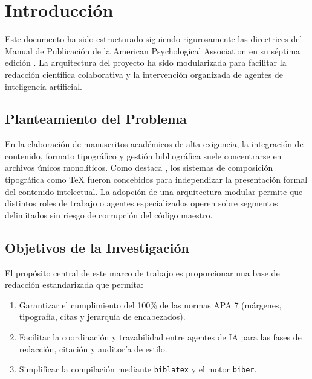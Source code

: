 \section{Introducción}\label{sec:introduccion}

Este documento ha sido estructurado siguiendo rigurosamente las directrices del Manual de Publicación de la American Psychological Association en su séptima edición \parencite{apa2020}. La arquitectura del proyecto ha sido modularizada para facilitar la redacción científica colaborativa y la intervención organizada de agentes de inteligencia artificial.

\subsection{Planteamiento del Problema}
En la elaboración de manuscritos académicos de alta exigencia, la integración de contenido, formato tipográfico y gestión bibliográfica suele concentrarse en archivos únicos monolíticos. Como destaca \textcite{knuth1984tex}, los sistemas de composición tipográfica como \TeX{} fueron concebidos para independizar la presentación formal del contenido intelectual. La adopción de una arquitectura modular permite que distintos roles de trabajo o agentes especializados operen sobre segmentos delimitados sin riesgo de corrupción del código maestro.

\subsection{Objetivos de la Investigación}
El propósito central de este marco de trabajo es proporcionar una base de redacción estandarizada que permita:
\begin{enumerate}
    \item Garantizar el cumplimiento del 100\% de las normas APA 7 (márgenes, tipografía, citas y jerarquía de encabezados).
    \item Facilitar la coordinación y trazabilidad entre agentes de IA para las fases de redacción, citación y auditoría de estilo.
    \item Simplificar la compilación mediante \texttt{biblatex} y el motor \texttt{biber}.
\end{enumerate}

